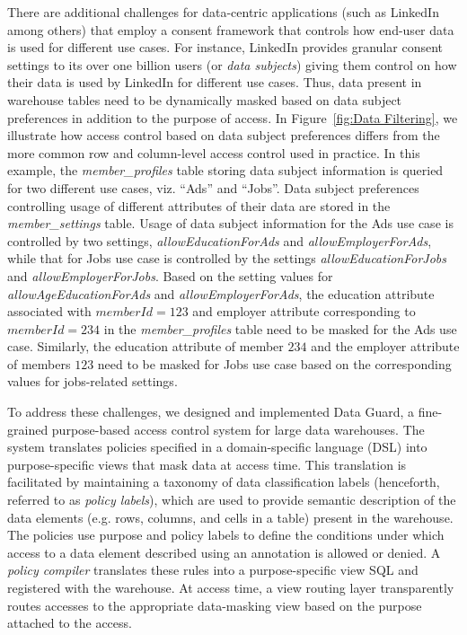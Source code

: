 There are additional challenges for data-centric applications (such as LinkedIn among others) that employ a consent framework that controls how end-user data is used for different use cases. For instance, LinkedIn provides granular consent settings to its over one billion users (or {\em data subjects}) giving them control on how their data is used by LinkedIn for different use cases. 
Thus, data present in warehouse tables need to be dynamically masked based on data subject preferences in addition to the purpose of access. 
In Figure~\ref{fig:Data Filtering}, we illustrate how access control based on data subject preferences differs from the more common row and column-level access control used in practice. 
In this example, the {\em member\_profiles} table storing data subject information is queried for two different use cases, viz. “Ads” and “Jobs”. 
Data subject preferences controlling usage of different attributes of their data are stored in the \emph{member\_settings} table. 
Usage of data subject information for the Ads use case is controlled by two settings, \emph{allowEducationForAds} and \emph{allowEmployerForAds}, 
while that for Jobs use case is controlled by the settings \emph{allowEducationForJobs} and \emph{allowEmployerForJobs}. 
Based on the setting values for \emph{allowAgeEducationForAds} and \emph{allowEmployerForAds}, 
the education attribute associated with $memberId=123$ and employer attribute corresponding to $memberId=234$ in the {\em member\_profiles} table need to be masked for the Ads use case. 
Similarly, the education attribute of member $234$ and the employer attribute of members $123$ need to be masked for Jobs use case based on the corresponding values for jobs-related settings.



To address these challenges, we designed and implemented Data Guard, a fine-grained purpose-based access control system for large data warehouses. The system translates policies specified in a domain-specific language (DSL) into purpose-specific views that mask data at access time. This translation is facilitated by maintaining a taxonomy of data classification labels (henceforth, referred to as \emph{policy labels}), which are used to provide semantic description of the data elements (e.g. rows, columns, and cells in a table) present in the warehouse. The policies use purpose and policy labels to define the conditions under which access to a data element described using an annotation is allowed or denied.  A \emph{policy compiler} translates these rules into a purpose-specific view SQL and registered with the warehouse. At access time, a view routing layer transparently routes accesses to the appropriate data-masking view based on the purpose attached to the access.  

